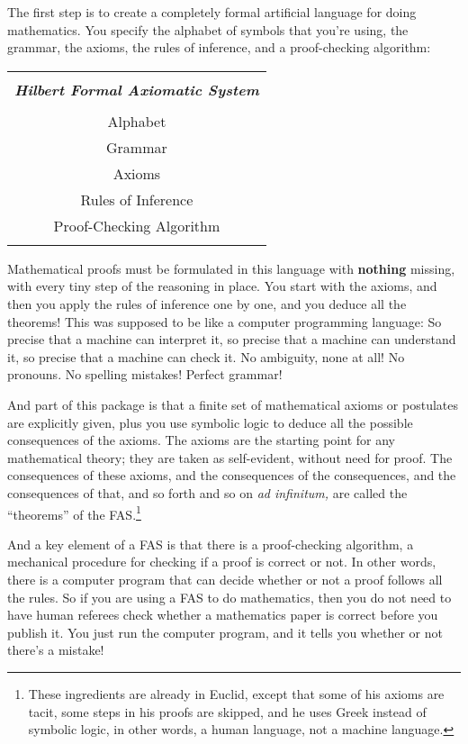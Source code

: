 \documentclass[12pt]{book}
\begin{document}
The first step is to create a completely formal artificial language for doing mathematics.
You specify the alphabet of symbols that you're using, the grammar, the axioms, the rules of
inference, and a proof-checking algorithm:

\begin{center}
\begin{tabular}{|c|}
\hline
\\
\textbf{\emph{\large Hilbert Formal Axiomatic System}}
\\
\\
Alphabet
\\
Grammar
\\
Axioms
\\
Rules of Inference
\\
Proof-Checking Algorithm
\\
\\
\hline
\end{tabular}
\end{center}

Mathematical proofs must be formulated in this language with \textbf{nothing} missing, with
every tiny step of the reasoning in place.
You start with the axioms, and then you apply the rules of inference one by one, and
you deduce all the theorems!
This was supposed to be like a computer programming language: So precise that a machine
can interpret it, so precise that a machine can understand it, so precise that a machine
can check it. 
No ambiguity, none at all!
No pronouns.  No spelling mistakes!  Perfect grammar!

And part of this package is that a finite set of mathematical axioms or postulates 
are explicitly given, plus you use symbolic logic to deduce all the possible consequences of the
axioms.  The axioms are the starting point for any mathematical theory; they are taken
as self-evident, without need for proof.  The consequences
of these axioms, and the consequences of the consequences, and the consequences of that, 
and so forth and so on \emph{ad infinitum,} are called
the ``theorems'' of the FAS.\footnote
{These ingredients are already in Euclid, except that some of his axioms are tacit,
some steps in his proofs are skipped, and he uses Greek instead of symbolic logic, in other words,
a human language, not a machine language.}

And a key element of a FAS is that there is a proof-checking algorithm, a mechanical
procedure for checking if a proof is correct or not.  In other words, there 
is a computer program that can decide whether or not a proof follows all the rules.
So if you are using a FAS to do mathematics, then you do not need to have
human referees check whether a mathematics paper is correct before you publish it.
You just run the computer program, and it tells you whether or not there's a mistake!
\end{document}
